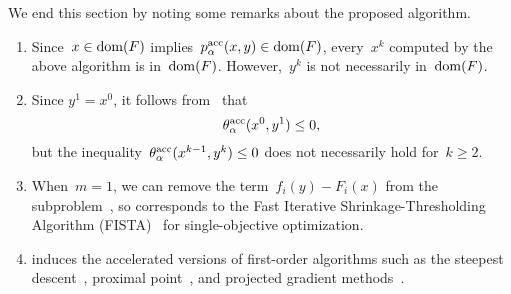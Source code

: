 \documentclass[../main]{subfiles}
\begin{document}
We end this section by noting some remarks about the proposed algorithm.
\begin{remark} 
    \begin{enumerate}
        \item Since~$x \in \operatorname{dom}(F)$ implies~$p^{\mathrm{acc}}_\alpha(x, y) \in \operatorname{dom}(F)$, every~$x^k$ computed by the above algorithm is in~$\operatorname{dom}(F)$.
              However,~$y^k$ is not necessarily in~$\operatorname{dom}(F)$.
        \item Since $y^1 = x^0$, it follows from~ that
              \begin{equation} \label{eq:subprob ineq}
                  \theta^{\mathrm{acc}}_\alpha(x^0, y^1) \le 0
                  ,\end{equation}
              but the inequality~$\theta^{\mathrm{acc}}_\alpha(x^{k - 1}, y^k) \le 0$ does not necessarily hold for~$k \ge 2$.
        \item When~$m = 1$, we can remove the term~$f_i(y) - F_i(x)$ from the subproblem~, so  corresponds to the Fast Iterative Shrinkage-Thresholding Algorithm (FISTA)~\cite{Beck2009} for single-objective optimization.
        \item {} induces the accelerated versions of first-order algorithms such as the steepest descent~\cite{Fliege2000}, proximal point~\cite{Bonnel2005}, and projected gradient methods~\cite{Grana-Drummond2004}.
    \end{enumerate}
\end{remark}
\end{document}
